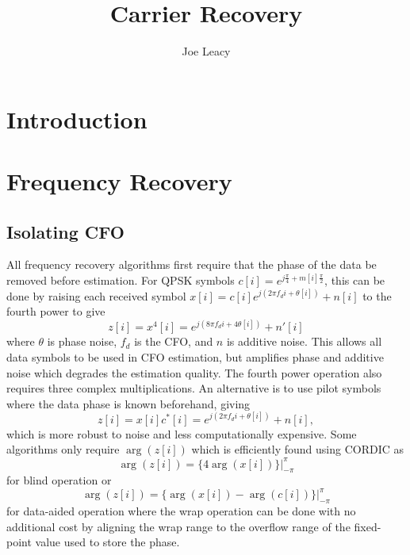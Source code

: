 \documentclass[12pt,a4paper]{article}
\title{Carrier Recovery}
\author{Joe Leacy}
\begin{document}
\maketitle

\section{Introduction}

\section{Frequency Recovery}
\subsection{Isolating CFO}
All frequency recovery algorithms first require that the phase of the data be removed before estimation. For QPSK symbols \(c[i] = e^{j\frac{\pi}{4} + m[i]\frac{\pi}{2}}\), this can be done by raising each received symbol \(x[i] = c[i]e^{j(2\pi f_d i + \theta[i])} + n[i]\) to the fourth power to give
\begin{equation}
    z[i] = x^4[i] = e^{j(8\pi f_d i + 4 \theta[i])} + n'[i]
    \label{eq:blind_noise}
\end{equation}
where \(\theta\) is phase noise, \(f_d\) is the CFO, and \(n\) is additive noise. This allows all data symbols to be used in CFO estimation, but amplifies phase and additive noise which degrades the estimation quality. The fourth power operation also requires three complex multiplications. An alternative is to use pilot symbols where the data phase is known beforehand, giving
\begin{equation}
    z[i] = x[i]c^*[i] = e^{j(2\pi f_d i + \theta[i])} + n[i],
    \label{eq:data_noise}
\end{equation}
which is more robust to noise and less computationally expensive. Some algorithms only require \(\arg(z[i])\) which is efficiently found using CORDIC as
\begin{equation}
    \arg(z[i]) = \{4\arg(x[i])\}|_{-\pi}^\pi
    \label{eq:phase_blind}
\end{equation}
for blind operation or
\begin{equation}
    \arg(z[i]) = \{\arg(x[i]) - \arg(c[i])\}|_{-\pi}^{\pi}
    \label{eq:phase_data}
\end{equation}
for data-aided operation where the wrap operation can be done with no additional cost by aligning the wrap range to the overflow range of the fixed-point value used to store the phase.
\end{document}
